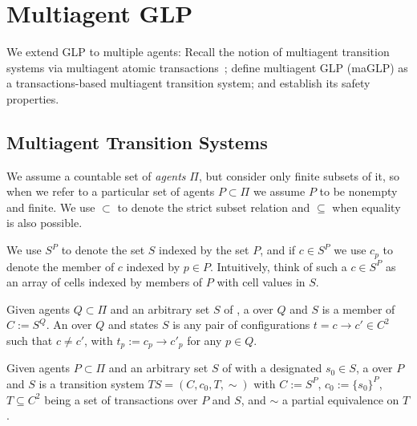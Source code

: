 \section{Multiagent GLP}\label{sec:maglp}

We extend GLP to multiple agents: Recall the notion of multiagent transition systems via multiagent atomic transactions~\cite{shapiro2021multiagent,shapiro2025atomic};  define multiagent GLP (maGLP) as a transactions-based multiagent transition system; and establish its safety properties. 

\subsection{Multiagent Transition Systems}
\label{sec:mts}
We assume a countable set of \emph{agents} $\Pi$, but consider only finite subsets of it, so when we refer to a particular set of agents $P \subset \Pi$ we assume $P$ to be nonempty and finite. We use $\subset$ to denote the strict subset relation and $\subseteq$ when equality is also possible.

We use $S^P$ to denote the set $S$ indexed by the set $P$, and if $c\in S^P$ we use $c_p$ to denote the member of $c$ indexed by $p\in P$. Intuitively, think of such a $c\in S^P$ as an array of cells indexed by members of $P$ with cell values in $S$.

\begin{definition}\label{def:transaction}
Given agents $Q \subset \Pi$ and an arbitrary set $S$ of , a  over $Q$ and $S$ is a member of $C:= S^Q$. An  over  $Q$ and states $S$ is any pair of configurations $t=c\rightarrow c' \in C^2$ such that $c\ne c'$, with $t_p := c_p \rightarrow c'_p$ for any $p\in Q$.
\end{definition}



\begin{definition}\label{def:mts}
Given agents $P \subset \Pi$ and an arbitrary set $S$ of  with a designated  $s_0\in S$, a  over $P$ and $S$ is a transition system $TS= (C,c_0,T,{\sim})$ with  $C:= S^P$,  $c_0:= \{s_0\}^P$,  $T\subseteq C^2$ being a set of transactions over $P$ and $S$, and ${\sim}$ a partial equivalence on $T$.
\end{definition}

